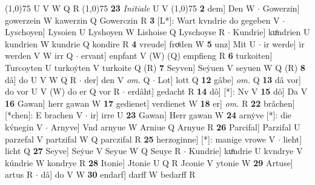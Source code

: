 \documentclass[8pt,a4paper,notitlepage]{article}
\begin{document}
\begin{table}[ht]
\begin{minipage}[t]{0.5\linewidth}
\begin{tabular}{rl}
\end{tabular}
\scriptsize
\line(1,0){75} \newline
U V W Q R \newline
\line(1,0){75} \newline
\textbf{23} \textit{Initiale} U V  \newline
\line(1,0){75} \newline
\textbf{2} dem] Den W  $\cdot$ Gowerzin] gowerzein W kawerzin Q Gowerczin R \textbf{3} [L*]: Wart kvndrie do gegeben V  $\cdot$ Lyschoyen] Lysoien U Lyshoyen W Lishoise Q Lyschoyse R  $\cdot$ Kundrie] kuͦndrien U kundrien W kundrie Q kondire R \textbf{4} vreude] froͤden W \textbf{5} unz] Mit U  $\cdot$ ir werde] ir werden V W irr Q  $\cdot$ ervant] enpfant V (W) (Q) empfieng R \textbf{6} turkoiten] Turcoyten U turkoẏten V turkoite Q (R) \textbf{7} Seyven] Seẏuen V seyuen W Q (R) \textbf{8} dâ] do U V W Q R  $\cdot$ der] den V \textit{om.} Q  $\cdot$ Lot] lott Q \textbf{12} gâbe] \textit{om.} Q \textbf{13} dâ vor] do vor U V (W) do er Q vor R  $\cdot$ erdâht] gedacht R \textbf{14} dô] [*]: Nv V \textbf{15} dô] Da V \textbf{16} Gawan] herr gawan W \textbf{17} gedienet] verdienet W \textbf{18} er] \textit{om.} R \textbf{22} brâchen] [*chen]: E brachen V  $\cdot$ ir] irre U \textbf{23} Gawan] Herr gawan W \textbf{24} arnẏve [*]: die kv́negin V  $\cdot$ Arnyve] Vnd arnyue W Arniue Q Arnyue R \textbf{26} Parcifal] Parzifal U parzefal V partzifal W Q parczifal R \textbf{25} herzoginne] [*]: manige vrowe V  $\cdot$ lieht] licht Q \textbf{27} Seyve] Seẏue V Seyue W Q Seuye R  $\cdot$ Kundrie] kuͦndrie U kvndrye V kúndrie W kondrye R \textbf{28} Itonie] Jtonie U Q R Jconie V ytonie W \textbf{29} Artuse] artus R  $\cdot$ dâ] do V W \textbf{30} endarf] darff W bedarff R \newline
\end{minipage}
\end{table}
\end{document}
